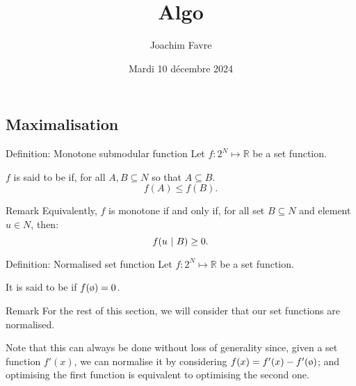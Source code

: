 \documentclass[a4paper]{article}
\title{Algo}
\author{Joachim Favre}
\date{Mardi 10 décembre 2024}
\begin{document}
\maketitle


\subsection{Maximalisation}

\begin{parag}{Definition: Monotone submodular function}
    Let $f: 2^N \mapsto \mathbb{R}$ be a set function.

    $f$ is said to be  if, for all $A, B \subseteq N$ so that $A \subseteq B$. 
    \[f\left(A\right) \leq f\left(B\right).\]

    \begin{subparag}{Remark}
        Equivalently, $f$ is monotone if and only if, for all set $B \subseteq N$ and element $u \in N$, then: 
        \[f\left(u \suchthat B\right) \geq 0.\]
    \end{subparag}
\end{parag}

\begin{parag}{Definition: Normalised set function}
    Let $f: 2^N \mapsto \mathbb{R}$ be a set function.

    It is said to be  if $f\left(\o\right) = 0$.

    \begin{subparag}{Remark}
        For the rest of this section, we will consider that our set functions are normalised.

        Note that this can always be done without loss of generality since, given a set function $f'\left(x\right)$, we can normalise it by considering $f\left(x\right) = f'\left(x\right) - f'\left(\o\right)$; and optimising the first function is equivalent to optimising the second one.
    \end{subparag}
\end{parag}
\end{document}
